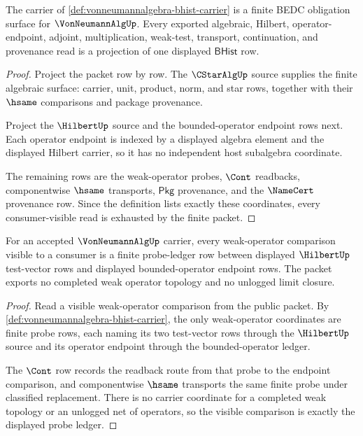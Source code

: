 \begin{theorem}\label{thm:vonneumannalgebra-carrier-obligation}
The carrier of \autoref{def:vonneumannalgebra-bhist-carrier} is a finite BEDC obligation surface for $\VonNeumannAlgUp$. Every exported algebraic, Hilbert, operator-endpoint, adjoint, multiplication, weak-test, transport, continuation, and provenance read is a projection of one displayed $\mathsf{BHist}$ row.
\end{theorem}
\begin{proof}
Project the packet row by row. The $\CStarAlgUp$ source supplies the finite algebraic surface: carrier, unit, product, norm, and star rows, together with their $\hsame$ comparisons and package provenance.

Project the $\HilbertUp$ source and the bounded-operator endpoint rows next. Each operator endpoint is indexed by a displayed algebra element and the displayed Hilbert carrier, so it has no independent host subalgebra coordinate.

The remaining rows are the weak-operator probes, $\Cont$ readbacks, componentwise $\hsame$ transports, $\mathsf{Pkg}$ provenance, and the $\NameCert$ provenance row. Since the definition lists exactly these coordinates, every consumer-visible read is exhausted by the finite packet.
\end{proof}

\begin{theorem}\label{thm:vonneumannalgebra-weak-operator-ledger-exactness}
For an accepted $\VonNeumannAlgUp$ carrier, every weak-operator comparison visible to a consumer is a finite probe-ledger row between displayed $\HilbertUp$ test-vector rows and displayed bounded-operator endpoint rows. The packet exports no completed weak operator topology and no unlogged limit closure.
\end{theorem}
\begin{proof}
Read a visible weak-operator comparison from the public packet. By \autoref{def:vonneumannalgebra-bhist-carrier}, the only weak-operator coordinates are finite probe rows, each naming its two test-vector rows through the $\HilbertUp$ source and its operator endpoint through the bounded-operator ledger.

The $\Cont$ row records the readback route from that probe to the endpoint comparison, and componentwise $\hsame$ transports the same finite probe under classified replacement. There is no carrier coordinate for a completed weak topology or an unlogged net of operators, so the visible comparison is exactly the displayed probe ledger.
\end{proof}


